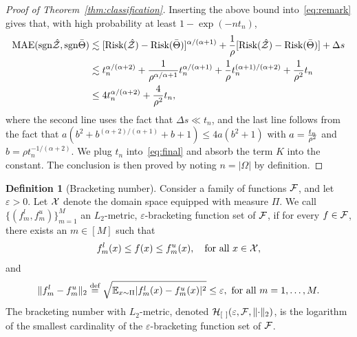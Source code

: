 \documentclass[11pt]{article}
\theoremstyle{plain}
\theoremstyle{definition}
\newtheorem{defn}{Definition}[section]
\def\sign{\textup{sgn}}
\def\risk{\textup{Risk}}
\begin{document}
\begin{proof}[Proof of Theorem~\ref{thm:classification}]
Inserting the above bound into~\eqref{eq:remark} gives that, with high probability at least $1-\exp(-nt_n)$,
\begin{align}\label{eq:final}
\textup{MAE}(\sign \hat \tZ, \sign \bar \Theta) &\lesssim [\risk(\hat \tZ)-\risk(\bar \Theta)]^{\alpha/(\alpha+1)}+{1\over \rho}[\risk(\hat \tZ)-\risk(\bar \Theta)]+\Delta s\notag \\
&\lesssim t_n^{\alpha/(\alpha+2)}+{1\over \rho^{\alpha/\alpha+1}}t_n^{\alpha/(\alpha+1)}+{1\over \rho}t_n^{(\alpha+1)/(\alpha+2)}+{1\over \rho^2}t_n\notag \\
&\leq 4t_n^{\alpha/(\alpha+2)}+{4\over \rho^2}t_n,
\end{align}
where the second line uses the fact that $\Delta s \ll t_n$, and the last line follows from the fact that $a(b^2+b^{(\alpha+2)/(\alpha+1)}+b+1) \leq 4 a (b^2+1)$ with $a={t_n \over \rho^2}$ and $b=\rho t_n^{-1/(\alpha+2)}$. We plug $t_n$ into~\eqref{eq:final} and absorb the term $K$ into the constant. The conclusion is then proved by noting $n=|\Omega|$ by definition. 
\end{proof}

\begin{defn}[Bracketing number]\label{pro:inftynorm}
Consider a family of functions $\mathcal{F}$, and let $\varepsilon>0$. Let $\mathcal{X} $ denote the domain space equipped with measure $\Pi$. We call $\{(f^l_m,f^u_m)\}_{m=1}^M$ an $L_2$-metric, $\varepsilon$-bracketing function set of $\mathcal{F}$, if for every $f\in \mathcal{F}$, there exists an $m\in[M]$ such that 
\[
f^l_m(x)\leq f(x)\leq f^u_m(x),\quad \text{for all }x\in\mathcal{X},
\]
and
\[
\lVert f^l_m-f^u_m\rVert_2\stackrel{\text{def}}{=}\sqrt{\mathbb{E}_{x\sim \Pi}|f^l_m(x)-f^u_m(x)|^2} \leq \varepsilon, \ \text{for all } m=1,\ldots,M. 
\]
The bracketing number with $L_2$-metric, denoted $\mathcal{H}_{[\ ]}(\varepsilon, \mathcal{F}, \lVert\cdot\rVert_2)$, is the logarithm of the smallest cardinality of the $\varepsilon$-bracketing function set of $\mathcal{F}$.  \\
\end{defn}
\end{document}
